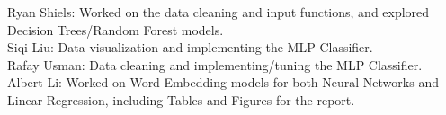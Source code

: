 \documentclass[journal]{IEEEtran}
\begin{document}
Ryan Shiels: Worked on the data cleaning and input functions, and explored Decision Trees/Random Forest models. \\
Siqi Liu: Data visualization and implementing the MLP Classifier. \\
Rafay Usman: Data cleaning and implementing/tuning the MLP Classifier. \\
Albert Li: Worked on Word Embedding models for both Neural Networks and Linear Regression, including Tables and Figures for the report.
\end{document}
